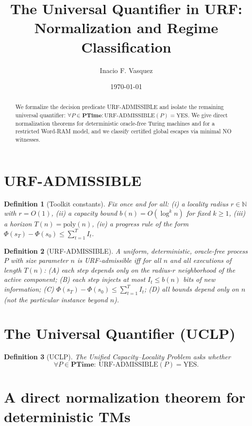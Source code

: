 \documentclass[11pt]{article}
\title{The Universal Quantifier in URF: Normalization and Regime Classification}
\author{Inacio F. Vasquez}
\date{\today}
\newtheorem{definition}{Definition}
\begin{document}
\maketitle

\begin{abstract}
We formalize the decision predicate URF-ADMISSIBLE and isolate the remaining universal quantifier:
$\forall P \in \mathbf{PTime}: \mathrm{URF\text{-}ADMISSIBLE}(P)=\mathrm{YES}$.
We give direct normalization theorems for deterministic oracle-free Turing machines and for a
restricted Word-RAM model, and we classify certified global escapes via minimal NO witnesses.
\end{abstract}

\section{URF-ADMISSIBLE}

\begin{definition}[Toolkit constants]
Fix once and for all:
(i) a locality radius $r\in\mathbb{N}$ with $r=O(1)$,
(ii) a capacity bound $b(n)=O(\log^k n)$ for fixed $k\ge 1$,
(iii) a horizon $T(n)=\mathrm{poly}(n)$,
(iv) a progress rule of the form $\Phi(s_T)-\Phi(s_0)\le \sum_{t=1}^T I_t$.
\end{definition}

\begin{definition}[URF-ADMISSIBLE]
A uniform, deterministic, oracle-free process $P$ with size parameter $n$ is \emph{URF-admissible}
iff for all $n$ and all executions of length $T(n)$:
(A) each step depends only on the radius-$r$ neighborhood of the active component;
(B) each step injects at most $I_t\le b(n)$ bits of new information;
(C) $\Phi(s_T)-\Phi(s_0)\le \sum_{t=1}^T I_t$;
(D) all bounds depend only on $n$ (not the particular instance beyond $n$).
\end{definition}

\section{The Universal Quantifier (UCLP)}

\begin{definition}[UCLP]
The Unified Capacity--Locality Problem asks whether
\[
\forall P\in\mathbf{PTime}:\ \mathrm{URF\text{-}ADMISSIBLE}(P)=\mathrm{YES}.
\]
\end{definition}

\section{A direct normalization theorem for deterministic TMs}
\end{document}
